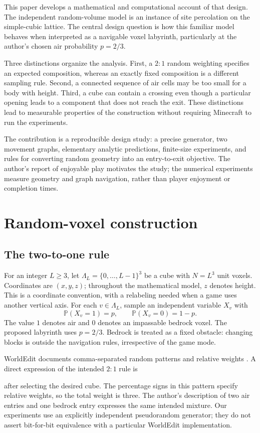 \documentclass[11pt,letterpaper]{article}
\newcommand{\Prob}{\mathbb{P}}
\begin{document}
This paper develops a mathematical and computational account of that design.
The independent random-volume model is an instance of site percolation on the
simple-cubic lattice. The central design question is how this familiar model
behaves when interpreted as a navigable voxel labyrinth, particularly at the
author's chosen air probability $p=2/3$.

Three distinctions organize the analysis. First, a $2{:}1$ random weighting
specifies an expected composition, whereas an exactly fixed composition is a
different sampling rule. Second, a connected sequence of air cells may be too
small for a body with height. Third, a cube can contain a crossing even though
a particular opening leads to a component that does not reach the exit.
These distinctions lead to measurable properties of the construction without
requiring Minecraft to run the experiments.

The contribution is a reproducible design study: a precise generator, two
movement graphs, elementary analytic predictions, finite-size experiments, and
rules for converting random geometry into an entry-to-exit objective.
The author's report of enjoyable play motivates the study; the numerical
experiments measure geometry and graph navigation, rather than player enjoyment
or completion times.

\section{Random-voxel construction}
\subsection{The two-to-one rule}
For an integer $L\geq 3$, let $\Lambda_L=\{0,\ldots,L-1\}^{3}$ be a cube with
$N=L^3$ unit voxels. Coordinates are $(x,y,z)$; throughout the mathematical
model, $z$ denotes height. This is a coordinate convention, with a relabeling
needed when a game uses another vertical axis.
For each $v\in\Lambda_L$, sample an independent variable $X_v$ with
\begin{equation}
 \Prob(X_v=1)=p,\qquad \Prob(X_v=0)=1-p.
 \label{eq:generator}
\end{equation}
The value $1$ denotes air and $0$ denotes an impassable bedrock voxel.
The proposed labyrinth uses $p=2/3$. Bedrock is treated as a fixed obstacle:
changing blocks is outside the navigation rules, irrespective of the game mode.

WorldEdit documents comma-separated random patterns and relative weights
\citep{worldedit}. A direct expression of the intended $2{:}1$ rule is
\begin{center}
\end{center}
after selecting the desired cube. The percentage signs in this pattern specify
relative weights, so the total weight is three. The author's description of two
air entries and one bedrock entry expresses the same intended mixture.
Our experiments use an explicitly independent pseudorandom generator; they do
not assert bit-for-bit equivalence with a particular WorldEdit implementation.
\end{document}
